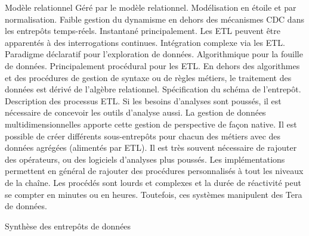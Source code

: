 \begin{table}[!ht]
\criteretabDonnee
    {Modèle relationnel}
    {Géré par le modèle relationnel. Modélisation en étoile et par normalisation.}
    {Faible gestion du dynamisme en dehors des mécanismes CDC dans les entrepôts temps-réels.}
\criteretabTraitement
    {Instantané principalement. Les ETL peuvent être apparentés à des interrogations continues.}
    {Intégration complexe via les ETL.}
    {Paradigme déclaratif pour l'exploration de données. Algorithmique pour la fouille de données. Principalement procédural pour les ETL.}
    {En dehors des algorithmes et des procédures de gestion de syntaxe ou de règles métiers, le traitement des données est dérivé de l'algèbre relationnel.}
\criteretabAdaptabilite
    {Spécification du schéma de l'entrepôt. Description des processus ETL. Si les besoins d'analyses sont poussés, il est nécessaire de concevoir les outils d'analyse aussi.}
    {La gestion de données multidimensionnelles apporte cette gestion de perspective de façon native. Il est possible de créer différents sous-entrepôts pour chacun des métiers avec des données agrégées (alimentés par ETL).}
    {Il est très souvent nécessaire de rajouter des opérateurs, ou des logiciels d'analyses plus poussés. Les implémentations permettent en général de rajouter des procédures personnalisés à tout les niveaux de la chaîne.}
    {Les procédés sont lourds et complexes et la durée de réactivité peut se compter en minutes ou en heures. Toutefois, ces systèmes manipulent des Tera de données.}
\caption{Synthèse des entrepôts de données}\label{tab:rw:supervision:warehouses:synthese}
\end{table}